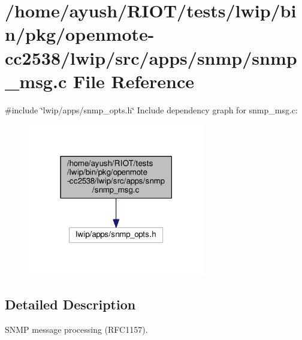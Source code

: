\hypertarget{openmote-cc2538_2lwip_2src_2apps_2snmp_2snmp__msg_8c}{}\section{/home/ayush/\+R\+I\+O\+T/tests/lwip/bin/pkg/openmote-\/cc2538/lwip/src/apps/snmp/snmp\+\_\+msg.c File Reference}
\label{openmote-cc2538_2lwip_2src_2apps_2snmp_2snmp__msg_8c}
{\ttfamily \#include \char`\"{}lwip/apps/snmp\+\_\+opts.\+h\char`\"{}}\newline
Include dependency graph for snmp\+\_\+msg.\+c\+:
\nopagebreak
\begin{figure}[H]
\begin{center}
\leavevmode
\includegraphics[width=219pt]{openmote-cc2538_2lwip_2src_2apps_2snmp_2snmp__msg_8c__incl}
\end{center}
\end{figure}


\subsection{Detailed Description}
S\+N\+MP message processing (R\+F\+C1157). 